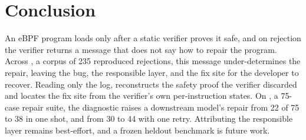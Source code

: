 


\section{Conclusion}
\label{sec:conclusion}

An eBPF program loads only after a static verifier proves it safe, and on rejection the verifier returns a message that does not say how to repair the program. Across \bench, a corpus of 235 reproduced rejections, this message under-determines the repair, leaving the bug, the responsible layer, and the fix site for the developer to recover. Reading only the log, \sys reconstructs the safety proof the verifier discarded and locates the fix site from the verifier's own per-instruction states. On \testset, a 75-case repair suite, the \sys diagnostic raises a downstream model's repair from 22 of 75 to 38 in one shot, and from 30 to 44 with one retry. Attributing the responsible layer remains best-effort, and a frozen heldout benchmark is future work.
